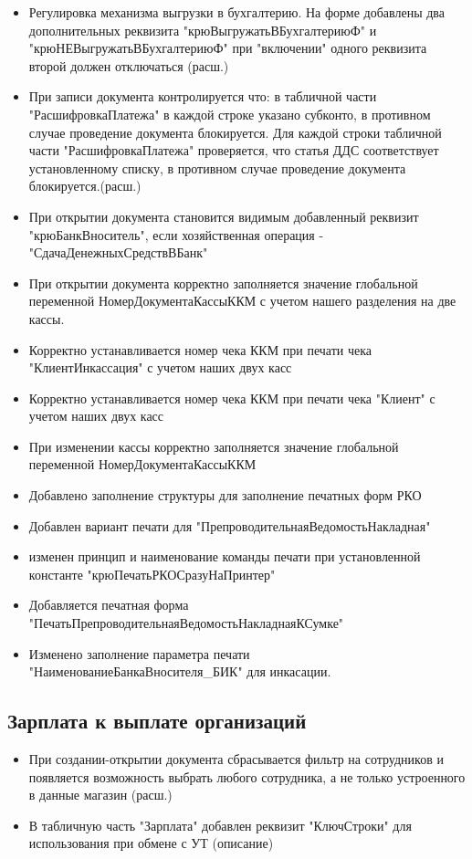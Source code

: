 \begin{itemize}
	\item  Регулировка механизма выгрузки в бухгалтерию. На форме добавлены два дополнительных реквизита "крюВыгружатьВБухгалтериюФ" и "крюНЕВыгружатьВБухгалтериюФ" при "включении" одного реквизита второй должен отключаться
	(расш.)
	\item При записи документа контролируется что: в табличной части "РасшифровкаПлатежа" в каждой строке указано субконто, в противном случае проведение документа блокируется. Для каждой строки табличной части "РасшифровкаПлатежа" проверяется, что статья ДДС соответствует установленному списку, в противном случае проведение документа блокируется.(расш.)
	\item При открытии документа становится видимым добавленный реквизит "крюБанкВноситель", если хозяйственная операция - "СдачаДенежныхСредствВБанк"
	\item При открытии документа корректно заполняется значение глобальной переменной НомерДокументаКассыККМ
	с учетом нашего разделения на две кассы.
	\item Корректно устанавливается номер чека ККМ при печати чека "КлиентИнкассация"  с учетом наших двух касс
	\item Корректно устанавливается номер чека ККМ при печати чека "Клиент"  с учетом наших двух касс
	\item При изменении кассы корректно заполняется значение глобальной переменной НомерДокументаКассыККМ
	\item Добавлено заполнение структуры для заполнение печатных форм РКО
	\item Добавлен вариант печати для "ПрепроводительнаяВедомостьНакладная"
	\item изменен принцип и наименование команды печати при установленной константе "крюПечатьРКОСразуНаПринтер"
	\item Добавляется печатная форма "ПечатьПрепроводительнаяВедомостьНакладнаяКСумке"
	\item Изменено заполнение параметра печати "НаименованиеБанкаВносителя\_БИК" для инкасации.


\end{itemize}



\subsection{Зарплата к выплате организаций}
\begin{itemize}
     \item При создании-открытии документа сбрасывается фильтр на сотрудников и появляется возможность выбрать любого сотрудника, а не только устроенного в данные магазин (расш.)
	 \item В табличную часть "Зарплата" добавлен реквизит "КлючСтроки" для использования при обмене с УТ
	 	(описание)

\end{itemize}

